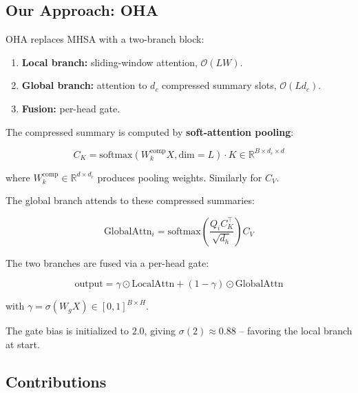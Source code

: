 \subsection{Our Approach: OHA}

OHA replaces MHSA with a two-branch block:

\begin{enumerate}
\item \textbf{Local branch:} sliding-window attention, $\mathcal{O}(L W)$.
\item \textbf{Global branch:} attention to $d_c$ compressed summary slots,
  $\mathcal{O}(L d_c)$.
\item \textbf{Fusion:} per-head gate.

\end{enumerate}
The compressed summary is computed by \textbf{soft-attention pooling}:

\begin{equation}
C_K = \text{softmax}(W_k^\text{comp} X, \text{dim}=L) \cdot K \in \mathbb{R}^{B \times d_c \times d}
\end{equation}

where $W_k^\text{comp} \in \mathbb{R}^{d \times d_c}$ produces pooling weights. 
Similarly for $C_V$.

The global branch attends to these compressed summaries:

\begin{equation}
\text{GlobalAttn}_i = \text{softmax}\!\left(\frac{Q_i C_K^\top}{\sqrt{d_h}}\right) C_V
\end{equation}

The two branches are fused via a per-head gate:

\begin{equation}
\text{output} = \gamma \odot \text{LocalAttn} + (1 - \gamma) \odot \text{GlobalAttn}
\end{equation}

with $\gamma = \sigma(W_g X) \in [0, 1]^{B \times H}$.

The gate bias is initialized to $2.0$, giving $\sigma(2) \approx 0.88$ -- 
favoring the local branch at start.

\subsection{Contributions}

